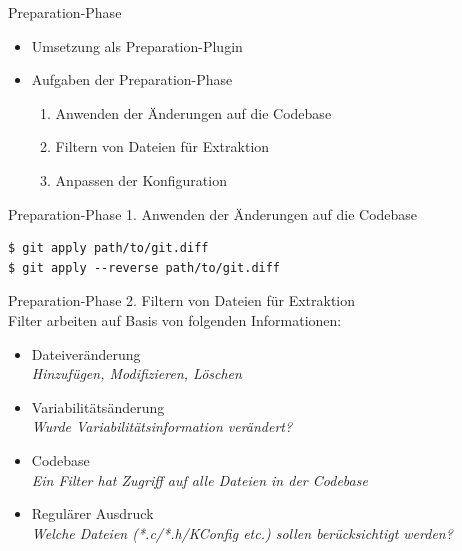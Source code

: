 \documentclass[aspectratio=43, noserifmath]{beamer}
\begin{document}
\begin{frame}{Preparation-Phase}
\begin{itemize}
    \item[\textbullet] Umsetzung als Preparation-Plugin
    \item[\textbullet] Aufgaben der Preparation-Phase \\
    \begin{enumerate}
       \item Anwenden der \"Anderungen auf die Codebase
       \item Filtern von Dateien f\"ur Extraktion
       \item Anpassen der Konfiguration
    \end{enumerate}
\end{itemize}
\end{frame}

\begin{frame}[containsverbatim]{Preparation-Phase}
1. Anwenden der \"Anderungen auf die Codebase

\begin{verbatim}
$ git apply path/to/git.diff
$ git apply --reverse path/to/git.diff
\end{verbatim}

\end{frame}
\begin{frame}{Preparation-Phase}
2. Filtern von Dateien f\"ur Extraktion \\
Filter arbeiten auf Basis von folgenden Informationen:
\pause
\begin{itemize}
    \item[\textbullet] Dateiver\"anderung \\ \emph{Hinzuf\"ugen, Modifizieren, L\"oschen}
    \pause
    \item[\textbullet] Variabilit\"ats\"anderung \\ \emph{Wurde Variabilit\"atsinformation ver\"andert?}
    \pause
    \item[\textbullet] Codebase \\ \emph{Ein Filter hat Zugriff auf alle Dateien in der Codebase}
    \pause
    \item[\textbullet] Regul\"arer Ausdruck \\ \emph{Welche Dateien (*.c/*.h/KConfig etc.) sollen ber\"ucksichtigt werden?}
\end{itemize}
\end{frame}
\end{document}
